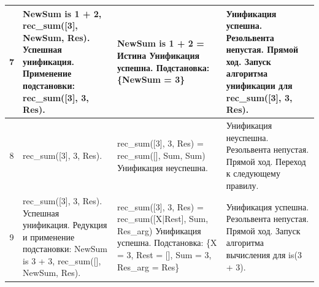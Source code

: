 \begin{tabularx}{\textwidth}{|c|>{\small}X|>{\small}X|>{\small}X|}
	7                                                                                  &
	NewSum is 1 + 2, \newline
	rec\_sum([3], NewSum, Res). \newline
	Успешная унификация. \newline
	Применение подстановки: \newline
	rec\_sum([3], 3, Res).                                                             &
	NewSum is 1 + 2 = \newline
	Истина \newline
	Унификация успешна. \newline
	Подстановка: \newline
	\{NewSum = 3\}                                                                     &
	Унификация успешна. \newline
	Резольвента непустая. \newline
	Прямой ход. \newline
	Запуск алгоритма унификации для rec\_sum([3], 3, Res).                               \\
	\hline

	8                                                                                  &
	rec\_sum([3], 3, Res).                                                             &
	rec\_sum([3], 3, Res) = \newline
	rec\_sum([], Sum, Sum) \newline
	Унификация неуспешна.                                                              &
	Унификация неуспешна. \newline
	Резольвента непустая. \newline
	Прямой ход. Переход к следующему правилу.                                            \\
	\hline

	9                                                                                  &
	rec\_sum([3], 3, Res). \newline
	Успешная унификация. \newline
	Редукция и применение подстановки: \newline
	NewSum is 3 + 3, \newline
	rec\_sum([], NewSum, Res).                                                         &
	rec\_sum([3], 3, Res) = \newline
	rec\_sum([X|Rest], Sum, Res\_arg) \newline
	Унификация успешна. \newline
	Подстановка: \newline
	\{X = 3, Rest = [], Sum = 3, Res\_arg = Res\}                                      &
	Унификация успешна. \newline
	Резольвента непустая. \newline
	Прямой ход. \newline
	Запуск алгоритма вычисления для is(3 + 3).                                           \\
	\hline


\end{tabularx}
